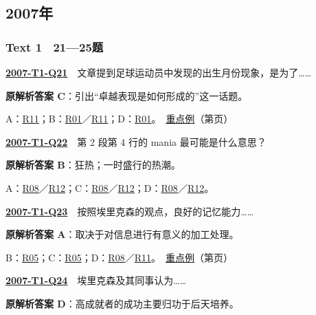 \documentclass[11pt,a4paper]{article}
\begin{document}
\subsection{2007年}\label{year-2007}
\subsubsection{Text 1　21—25题}
\label{idx-2007-T1-Q21}\noindent\textbf{\href{https://zj139.github.io/math-notes/english/a69829b7fe6a2f532d31c053/\#q21}{2007-T1-Q21}}　文章提到足球运动员中发现的出生月份现象，是为了……\par\nopagebreak
\noindent\textbf{原解析答案 C}：引出“卓越表现是如何形成的”这一话题。\par\nopagebreak
\noindent A：\hyperref[cat-R11]{R11}；B：\hyperref[cat-R01]{R01}／\hyperref[cat-R11]{R11}；D：\hyperref[cat-R01]{R01}。　\hyperref[case-2007-T1-Q21]{重点例}（第\pageref{case-2007-T1-Q21}页）\par\smallskip
{}\label{idx-2007-T1-Q22}\noindent\textbf{\href{https://zj139.github.io/math-notes/english/a69829b7fe6a2f532d31c053/\#q22}{2007-T1-Q22}}　第 2 段第 4 行的 mania 最可能是什么意思？\par\nopagebreak
\noindent\textbf{原解析答案 B}：狂热；一时盛行的热潮。\par\nopagebreak
\noindent A：\hyperref[cat-R08]{R08}／\hyperref[cat-R12]{R12}；C：\hyperref[cat-R08]{R08}／\hyperref[cat-R12]{R12}；D：\hyperref[cat-R08]{R08}／\hyperref[cat-R12]{R12}。\par\smallskip
{}\label{idx-2007-T1-Q23}\noindent\textbf{\href{https://zj139.github.io/math-notes/english/a69829b7fe6a2f532d31c053/\#q23}{2007-T1-Q23}}　按照埃里克森的观点，良好的记忆能力……\par\nopagebreak
\noindent\textbf{原解析答案 A}：取决于对信息进行有意义的加工处理。\par\nopagebreak
\noindent B：\hyperref[cat-R05]{R05}；C：\hyperref[cat-R05]{R05}；D：\hyperref[cat-R08]{R08}／\hyperref[cat-R11]{R11}。　\hyperref[case-2007-T1-Q23]{重点例}（第\pageref{case-2007-T1-Q23}页）\par\smallskip
{}\label{idx-2007-T1-Q24}\noindent\textbf{\href{https://zj139.github.io/math-notes/english/a69829b7fe6a2f532d31c053/\#q24}{2007-T1-Q24}}　埃里克森及其同事认为……\par\nopagebreak
\noindent\textbf{原解析答案 D}：高成就者的成功主要归功于后天培养。\par\nopagebreak
\end{document}
